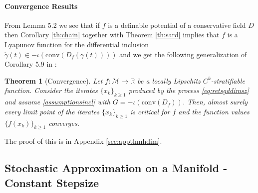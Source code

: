 \documentclass{article}
\newtheorem{theorem}{Theorem}
\newcommand{\CM}{\mathcal{M}}
\newcommand{\BR}{\mathbb{R}}
\begin{document}
\paragraph{Convergence Results}

From \cite{davis2020stochastic} Lemma 5.2 we see that if $f$ is a definable potential of a conservative field $D$ then Corollary \ref{th:chain} together with Theorem \ref{th:sard} implies that $f$ is a Lyapunov function for the differential inclusion $\dot \gamma(t)\in -\iota(\text{conv}(D_f(\gamma(t))))$ and we get the following generalization of Corollary 5.9 in \cite{davis2020stochastic}:
\begin{theorem}[Convergence]\label{th:convergence}
    Let $f:\CM\to\BR$ be a locally Lipschitz $C^k$-stratifiable function. Consider the iterates $\{x_k\}_{k\geq 1}$ produced by the process \eqref{eq:retsgddimsz} and assume \ref{assumptionsincl} with $G=-\iota(\text{conv}(D_f))$. Then, almost surely every limit point of the iterates $\{x_k\}_{k\geq 1}$ is critical for $f$ and the function values $\{f(x_k)\}_{k\geq 1}$ converges. 
\end{theorem}

The proof of this is in Appendix \ref{sec:appthmhdim}.








\subsection{Stochastic Approximation on a Manifold - Constant Stepsize}
\end{document}
